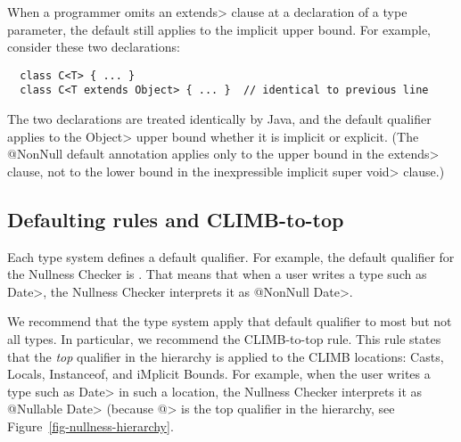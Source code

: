 

When a programmer omits an \<extends> clause at a declaration of a type
parameter, the default still applies to the implicit upper bound.  For
example, consider these two declarations:

\begin{Verbatim}
  class C<T> { ... }
  class C<T extends Object> { ... }  // identical to previous line
\end{Verbatim}

\noindent
The two declarations are treated identically by Java, and the default
qualifier applies to the \<Object> upper bound whether it is implicit or
explicit.  (The @NonNull default annotation applies only to the upper bound
in the \<extends> clause, not to the lower bound in the inexpressible
implicit \<super void> clause.)


\subsection{Defaulting rules and CLIMB-to-top\label{climb-to-top}}

Each type system defines a default qualifier.  For example, the default
qualifier for the Nullness Checker is
.  That means that when a user
writes a type such as \<Date>, the Nullness Checker interprets it as 
\<@NonNull Date>.

We recommend that the type system apply that default qualifier to most but
not all types.  In particular, we recommend the CLIMB-to-top rule.  This
rule states that the \emph{top} qualifier in the hierarchy is applied to
the CLIMB locations:  Casts, Locals, Instanceof, and iMplicit Bounds.
For example, when the user writes a type such as \<Date> in such a
location, the Nullness Checker interprets it as \<@Nullable Date> (because
\<@> is the top qualifier in the
hierarchy, see Figure~\ref{fig-nullness-hierarchy}.


